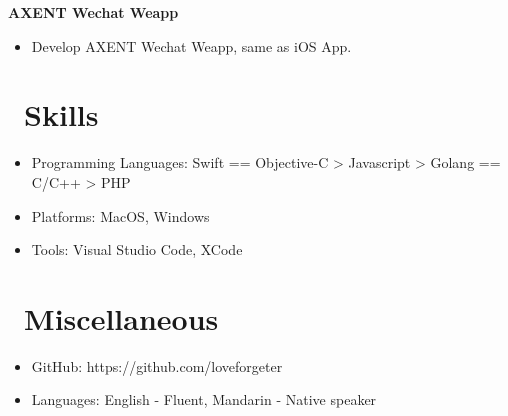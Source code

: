 \documentclass{resume}
\begin{document}
\begin{onehalfspacing}
    \textbf{AXENT Wechat Weapp}
    \begin{itemize}
        \item Develop AXENT Wechat Weapp, same as iOS App.
    \end{itemize}
\end{onehalfspacing}

\section{\faCogs\ Skills}
\begin{itemize}[parsep=0.5ex]
  \item Programming Languages: Swift == Objective-C > Javascript > Golang == C/C++ > PHP
  \item Platforms: MacOS, Windows
  \item Tools: Visual Studio Code, XCode
\end{itemize}

\section{\faInfo\ Miscellaneous}
\begin{itemize}[parsep=0.5ex]
  \item GitHub: https://github.com/loveforgeter
  \item Languages: English - Fluent, Mandarin - Native speaker
\end{itemize}
\end{document}
